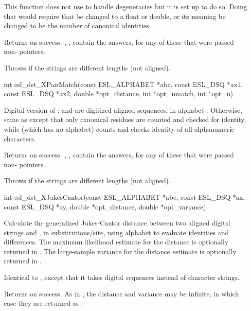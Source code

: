 \begin{sreapi}
This function does not use  to handle
degeneracies but it is set up to do so. Doing that would
require that  be changed to a float or double,
or its meaning be changed to be the number of canonical
identities.

Returns  on success. , , 
contain the answers, for any of these that were passed
non- pointers.

Throws  if the strings are different lengths (not aligned).


\hypertarget{func:esl_dst_XPairMatch()}
{\item[int esl\_dst\_XPairMatch(const ESL\_ALPHABET *abc, const ESL\_DSQ *ax1, const ESL\_DSQ *ax2, 
		   double *opt\_distance, int *opt\_nmatch, int *opt\_n)]}

Digital version of :  and
 are digitized aligned sequences, in alphabet
. Otherwise, same as  except
that only canonical residues are counted and checked for
identity, while  (which has no
alphabet) counts and checks identity of all alphanumeric
characters.

Returns  on success. , , 
contain the answers, for any of these that were passed
non- pointers.

Throws  if the strings are different lengths (not aligned).


\hypertarget{func:esl_dst_XJukesCantor()}
{\item[int esl\_dst\_XJukesCantor(const ESL\_ALPHABET *abc, const ESL\_DSQ *ax, const ESL\_DSQ *ay, 
		     double *opt\_distance, double *opt\_variance)]}

Calculate the generalized Jukes-Cantor distance between two
aligned digital strings  and , in substitutions/site, 
using alphabet  to evaluate identities and differences.
The maximum likelihood estimate for the distance is optionally returned in
. The large-sample variance for the distance
estimate is optionally returned in .

Identical to , except that it takes
digital sequences instead of character strings.

Returns  on success. As in , the
distance and variance may be infinite, in which case they
are returned as .


\end{sreapi}
